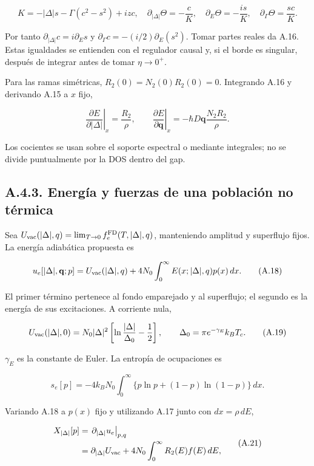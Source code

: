 \documentclass[
  spanish,
  10pt,
  a4paper,
]{article}
\begin{document}
\[
K=-|\Delta|s-\Gamma(c^2-s^2)+izc,
\quad \partial_{|\Delta|}\Theta=-\frac{c}{K},
\quad \partial_E\Theta=-\frac{is}{K},
\quad \partial_\Gamma\Theta=\frac{sc}{K}.
\tag{A.16a}
\]

Por tanto \(\partial_{|\Delta|}c=i\partial_Es\) y
\(\partial_\Gamma c=-(i/2)\partial_E(s^2)\). Tomar partes reales da
A.16. Estas igualdades se entienden con el regulador causal y, si el
borde es singular, después de integrar antes de tomar \(\eta\to0^+\).

Para las ramas simétricas, \(R_2(0)=N_2(0)R_2(0)=0\). Integrando A.16 y
derivando A.15 a \(x\) fijo,

\[
\left.\frac{\partial E}{\partial|\Delta|}\right|_x=\frac{R_2}{\rho},
\qquad
\left.\frac{\partial E}{\partial\mathbf q}\right|_x
=-\hbar D\mathbf q\frac{N_2R_2}{\rho}.
\tag{A.17}
\]

Los cocientes se usan sobre el soporte espectral o mediante integrales;
no se divide puntualmente por la DOS dentro del gap.

\subsection{A.4.3. Energía y fuerzas de una población no
térmica}\label{a.4.3.-energuxeda-y-fuerzas-de-una-poblaciuxf3n-no-tuxe9rmica}

Sea \(U_{\rm vac}(|\Delta|,q)=\lim_{T\to0}f_e^{\rm FD}(T,|\Delta|,q)\),
manteniendo amplitud y superflujo fijos. La energía adiabática propuesta
es

\[
u_e[|\Delta|,\mathbf q;p]
=U_{\rm vac}(|\Delta|,q)
+4N_0\int_0^\infty E(x;|\Delta|,q)p(x)\,dx.
\tag{A.18}
\]

El primer término pertenece al fondo emparejado y al superflujo; el
segundo es la energía de sus excitaciones. A corriente nula,

\[
U_{\rm vac}(|\Delta|,0)
=N_0|\Delta|^2\left[\ln\frac{|\Delta|}{\Delta_0}-\frac12\right],
\qquad \Delta_0=\pi e^{-\gamma_E}k_BT_c.
\tag{A.19}
\]

\(\gamma_E\) es la constante de Euler. La entropía de ocupaciones es

\[
s_e[p]=-4k_BN_0\int_0^\infty
\{p\ln p+(1-p)\ln(1-p)\}\,dx.
\tag{A.20}
\]

Variando A.18 a \(p(x)\) fijo y utilizando A.17 junto con
\(dx=\rho\,dE\),

\[
\begin{aligned}
X_{|\Delta|}[p]
&=\left.\partial_{|\Delta|}u_e\right|_{p,q}\\
&=\partial_{|\Delta|}U_{\rm vac}
+4N_0\int_0^\infty R_2(E)f(E)\,dE,
\end{aligned}
\tag{A.21}
\]
\end{document}
